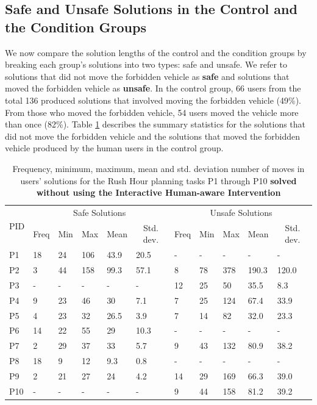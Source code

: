 \subsection{Safe and Unsafe Solutions in the Control and the Condition Groups}
We now compare the solution lengths of the control and the condition groups by breaking each group's solutions into two types: safe and unsafe. 
We refer to solutions that did not move the forbidden vehicle as \textbf{safe} and solutions that moved the forbidden vehicle as \textbf{unsafe}.
In the control group, 66 users from the total 136 produced solutions that involved moving the forbidden vehicle (49\%).
From those who moved the forbidden vehicle, 54 users moved the vehicle more than once (82\%).
Table \ref{tab:usersolutions} describes the summary statistics for the solutions that did not move the forbidden vehicle and the solutions that moved the forbidden vehicle produced by the human users in the control group.

\begin{table}[tpb]
\caption{Frequency, minimum, maximum, mean and std. deviation number of moves in users' solutions for the Rush Hour planning tasks P1 through P10 \textbf{solved without using the Interactive Human-aware Intervention}}
\begin{tabular}{|l|l|l|l|l|l|l|l|l|l|l|}
\hline
\multicolumn{1}{|c|}{\multirow{2}{*}{PID}} &
  \multicolumn{5}{c|}{Safe Solutions} &
  \multicolumn{5}{c|}{Unsafe Solutions} \\ \cline{2-11} 
\multicolumn{1}{|c|}{} &
  \multicolumn{1}{c|}{Freq} &
  \multicolumn{1}{c|}{Min} &
  \multicolumn{1}{c|}{Max} &
  \multicolumn{1}{c|}{Mean} &
  \multicolumn{1}{c|}{Std. dev.} &
  \multicolumn{1}{c|}{Freq} &
  \multicolumn{1}{c|}{Min} &
  \multicolumn{1}{c|}{Max} &
  \multicolumn{1}{c|}{Mean} &
  \multicolumn{1}{c|}{Std. dev.} \\ \hline
P1  & 18 & 24 & 106 & 43.9  & 20.5  & -  & -  & -   & -    & -    \\ 
P2  &  3  & 44 & 158 & 99.3 & 57.1 & 8  & 78 & 378 & 190.3 & 120.0\\ 
P3  & -  & -  & -   & -     & -     & 12 & 25 & 50  & 35.5 & 8.3  \\ 
P4  & 9  & 23 & 46  & 30    & 7.1   & 7  & 25 & 124 & 67.4 & 33.9 \\ 
P5  & 4  & 23 & 32  & 26.5  & 3.9   & 7  & 14 & 82  & 32.0 & 23.3 \\
P6  & 14 & 22 & 55  & 29    & 10.3  & -  & -  & -   & -    & -    \\
P7  & 2  & 29 & 37  & 33    & 5.7   & 9  & 43 & 132 & 80.9 & 38.2 \\ 
P8  & 18 & 9  & 12  & 9.3   & 0.8   & -  & -  & -   & -    & -    \\
P9  & 2  & 21 & 27  & 24    & 4.2   & 14 & 29 & 169 & 66.3 & 39.0 \\
P10 & -  & -  & -   & -     & -     & 9  & 44 & 158 & 81.2 & 39.2 \\ \hline
\end{tabular}
\label{tab:usersolutions}
\end{table}

